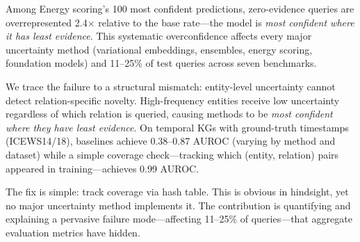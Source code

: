 
Among Energy scoring's 100 most confident predictions, zero-evidence queries are overrepresented 2.4$\times$ relative to the base rate---the model is \emph{most confident where it has least evidence}. This systematic overconfidence affects every major uncertainty method (variational embeddings, ensembles, energy scoring, foundation models) and 11--25\% of test queries across seven benchmarks.

We trace the failure to a structural mismatch: entity-level uncertainty cannot detect relation-specific novelty. High-frequency entities receive low uncertainty regardless of which relation is queried, causing methods to be \emph{most confident where they have least evidence}. On temporal KGs with ground-truth timestamps (ICEWS14/18), baselines achieve 0.38--0.87 AUROC (varying by method and dataset) while a simple coverage check---tracking which (entity, relation) pairs appeared in training---achieves 0.99 AUROC.

The fix is simple: track coverage via hash table. This is obvious in hindsight, yet no major uncertainty method implements it. The contribution is quantifying and explaining a pervasive failure mode---affecting 11--25\% of queries---that aggregate evaluation metrics have hidden.
